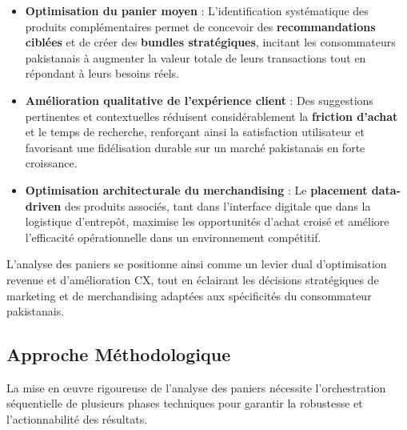 \documentclass[a4paper,12pt]{article}
\begin{document}
\begin{itemize}
    \item \textbf{Optimisation du panier moyen} : L'identification systématique des produits complémentaires permet de concevoir des \textbf{recommandations ciblées} et de créer des \textbf{bundles stratégiques}, incitant les consommateurs pakistanais à augmenter la valeur totale de leurs transactions tout en répondant à leurs besoins réels.
    
    \item \textbf{Amélioration qualitative de l'expérience client} : Des suggestions pertinentes et contextuelles réduisent considérablement la \textbf{friction d'achat} et le temps de recherche, renforçant ainsi la satisfaction utilisateur et favorisant une fidélisation durable sur un marché pakistanais en forte croissance.
    
    \item \textbf{Optimisation architecturale du merchandising} : Le \textbf{placement data-driven} des produits associés, tant dans l'interface digitale que dans la logistique d'entrepôt, maximise les opportunités d'achat croisé et améliore l'efficacité opérationnelle dans un environnement compétitif.
\end{itemize}

L'analyse des paniers se positionne ainsi comme un levier dual d'optimisation revenue et d'amélioration CX, tout en éclairant les décisions stratégiques de marketing et de merchandising adaptées aux spécificités du consommateur pakistanais.

\subsection{Approche Méthodologique}

La mise en œuvre rigoureuse de l'analyse des paniers nécessite l'orchestration séquentielle de plusieurs phases techniques pour garantir la robustesse et l'actionnabilité des résultats.
\end{document}
